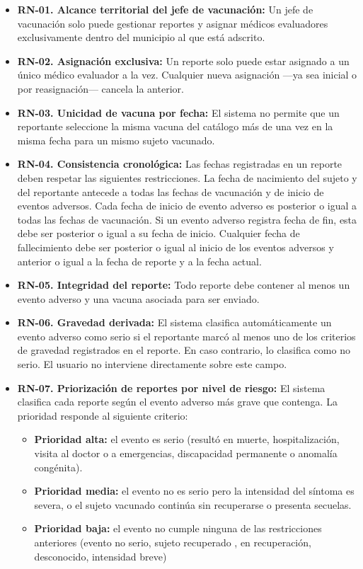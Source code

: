 \begin{itemize}

    \item \textbf{RN-01. Alcance territorial del jefe de vacunación:} Un jefe de vacunación solo puede gestionar reportes y asignar médicos evaluadores exclusivamente dentro del municipio al que está adscrito.

    \item \textbf{RN-02. Asignación exclusiva:} Un reporte solo puede estar asignado a un único médico evaluador a la vez. Cualquier nueva asignación —ya sea inicial o por reasignación— cancela la anterior.
    
    \item \textbf{RN-03. Unicidad de vacuna por fecha:} El sistema no permite que un reportante seleccione la misma vacuna del catálogo más de una vez en la misma fecha para un mismo sujeto vacunado.
    
    \item \textbf{RN-04. Consistencia cronológica:} Las fechas registradas en un reporte deben respetar las siguientes restricciones. La fecha de nacimiento del sujeto y del reportante antecede a todas las fechas de vacunación y de inicio de eventos adversos. Cada fecha de inicio de evento adverso es posterior o igual a todas las fechas de vacunación. Si un evento adverso registra fecha de fin, esta debe ser posterior o igual a su fecha de inicio. Cualquier fecha de fallecimiento debe ser posterior o igual al inicio de los eventos adversos y anterior o igual a la fecha de reporte y a la fecha actual.

    \item \textbf{RN-05. Integridad del reporte:} Todo reporte debe contener al menos un evento adverso y una vacuna asociada para ser enviado.
    
    \item \textbf{RN-06. Gravedad derivada:} El sistema clasifica automáticamente un evento adverso como serio si el reportante marcó al menos uno de los criterios de gravedad registrados en el reporte. En caso contrario, lo clasifica como no serio. El usuario no interviene directamente sobre este campo.
 
    \item \textbf{RN-07. Priorización de reportes por nivel de riesgo:} El sistema clasifica cada reporte según el evento adverso más grave que contenga. La prioridad responde al siguiente criterio:
    \begin{itemize}
        \item \textbf{Prioridad alta:} el evento es serio (resultó en muerte, hospitalización, visita al doctor o a emergencias, discapacidad permanente o anomalía congénita).
        \item \textbf{Prioridad media:} el evento no es serio pero la intensidad del síntoma es severa, o el sujeto vacunado continúa sin recuperarse o presenta secuelas.
        \item \textbf{Prioridad baja:} el evento no cumple ninguna de las restricciones anteriores (evento no serio, sujeto recuperado , en recuperación, desconocido, intensidad breve)
    \end{itemize}


\end{itemize}

